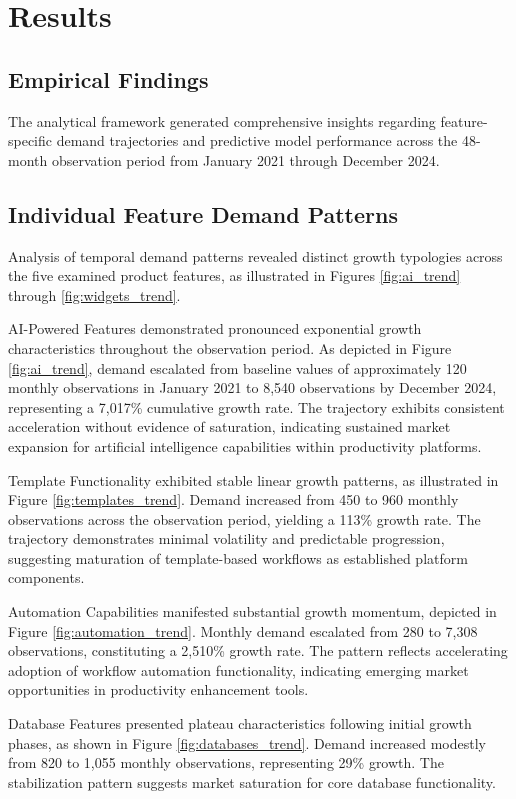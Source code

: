 \section{Results}

\subsection{Empirical Findings}
The analytical framework generated comprehensive insights regarding feature-specific demand trajectories and predictive model performance across the 48-month observation period from January 2021 through December 2024.

\subsection{Individual Feature Demand Patterns}
Analysis of temporal demand patterns revealed distinct growth typologies across the five examined product features, as illustrated in Figures \ref{fig:ai_trend} through \ref{fig:widgets_trend}.

AI-Powered Features demonstrated pronounced exponential growth characteristics throughout the observation period. As depicted in Figure \ref{fig:ai_trend}, demand escalated from baseline values of approximately 120 monthly observations in January 2021 to 8,540 observations by December 2024, representing a 7,017\% cumulative growth rate. The trajectory exhibits consistent acceleration without evidence of saturation, indicating sustained market expansion for artificial intelligence capabilities within productivity platforms.

Template Functionality exhibited stable linear growth patterns, as illustrated in Figure \ref{fig:templates_trend}. Demand increased from 450 to 960 monthly observations across the observation period, yielding a 113\% growth rate. The trajectory demonstrates minimal volatility and predictable progression, suggesting maturation of template-based workflows as established platform components.

Automation Capabilities manifested substantial growth momentum, depicted in Figure \ref{fig:automation_trend}. Monthly demand escalated from 280 to 7,308 observations, constituting a 2,510\% growth rate. The pattern reflects accelerating adoption of workflow automation functionality, indicating emerging market opportunities in productivity enhancement tools.

Database Features presented plateau characteristics following initial growth phases, as shown in Figure \ref{fig:databases_trend}. Demand increased modestly from 820 to 1,055 monthly observations, representing 29\% growth. The stabilization pattern suggests market saturation for core database functionality.


